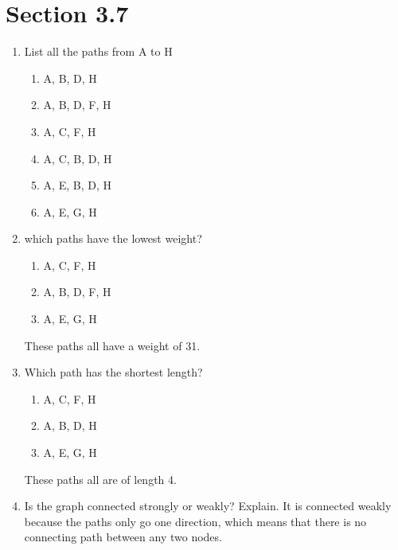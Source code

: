 \documentclass[11pt]{article}
\begin{document}
\section*{Section 3.7}

\begin{enumerate}

\item List all the paths from A to H 
\begin{enumerate}
    \item[] A, B, D, H
    \item[] A, B, D, F, H
    \item[] A, C, F, H
    \item[] A, C, B, D, H
    \item[] A, E, B, D, H
    \item[] A, E, G, H
\end{enumerate}

\item which paths have the lowest weight?
\begin{enumerate}
    \item[] A, C, F, H
    \item[] A, B, D, F, H
    \item[] A, E, G, H
\end{enumerate}
These paths all have a weight of 31. 

\item Which path has the shortest length?
\begin{enumerate}
    \item[] A, C, F, H
    \item[] A, B, D, H
    \item[] A, E, G, H
\end{enumerate}
These paths all are of length 4.

\item Is the graph connected strongly or weakly? Explain. \newline 
It is connected weakly because the paths only go one direction, which means that there is no connecting path between any two nodes.  

\end{enumerate}
\end{document}

